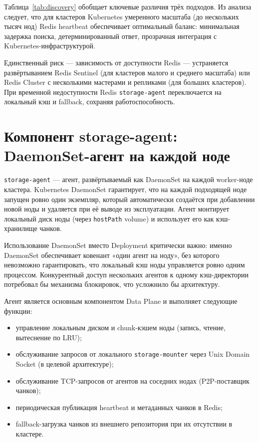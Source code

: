 Таблица~\ref{tab:discovery} обобщает ключевые различия трёх подходов. Из анализа следует, что для кластеров Kubernetes умеренного масштаба (до нескольких тысяч нод) Redis heartbeat обеспечивает оптимальный баланс: минимальная задержка поиска, детерминированный ответ, прозрачная интеграция с Kubernetes-инфраструктурой.

Единственный риск --- зависимость от доступности Redis --- устраняется развёртыванием Redis Sentinel (для кластеров малого и среднего масштаба) или Redis Cluster с несколькими мастерами и репликами (для больших кластеров). При временной недоступности Redis \texttt{storage-agent} переключается на локальный кэш и fallback, сохраняя работоспособность.

\section{Компонент storage-agent: DaemonSet-агент на каждой ноде}

\texttt{storage-agent} --- агент, развёртываемый как DaemonSet на каждой worker-ноде кластера. Kubernetes DaemonSet гарантирует, что на каждой подходящей ноде запущен ровно один экземпляр, который автоматически создаётся при добавлении новой ноды и удаляется при её выводе из эксплуатации. Агент монтирует локальный диск ноды (через \texttt{hostPath} volume) и использует его как кэш-хранилище чанков.

Использование DaemonSet вместо Deployment критически важно: именно DaemonSet обеспечивает ковенант «один агент на ноду», без которого невозможно гарантировать, что локальный кэш ноды управляется ровно одним процессом. Конкурентный доступ нескольких агентов к одному кэш-директории потребовал бы механизма блокировок, что усложнило бы архитектуру.

Агент является основным компонентом Data Plane и выполняет следующие функции:

\begin{itemize}[leftmargin=*]
  \item управление локальным диском и chunk-кэшем ноды (запись, чтение, вытеснение по LRU);
  \item обслуживание запросов от локального \texttt{storage-mounter} через Unix Domain Socket (в целевой архитектуре);
  \item обслуживание TCP-запросов от агентов на соседних нодах (P2P-поставщик чанков);
  \item периодическая публикация heartbeat и метаданных чанков в Redis;
  \item fallback-загрузка чанков из внешнего репозитория при их отсутствии в кластере.
\end{itemize}

